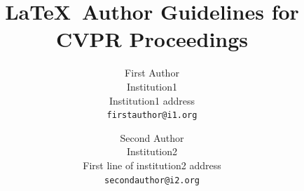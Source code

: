 \documentclass[review]{cvpr}
\begin{document}
\title{\LaTeX\ Author Guidelines for CVPR Proceedings}

\author{First Author\\
Institution1\\
Institution1 address\\
{\tt\small firstauthor@i1.org}
\and
Second Author\\
Institution2\\
First line of institution2 address\\
{\tt\small secondauthor@i2.org}
}

\maketitle


\begin{abstract}

\end{abstract}







{\small


}
\end{document}
